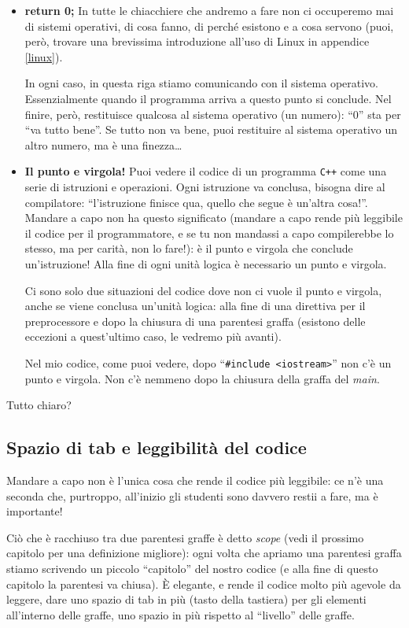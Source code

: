 \begin{itemize}
\item\textbf{return 0;} In tutte le chiacchiere che andremo a fare non ci occuperemo mai di sistemi operativi, di cosa fanno, di perché esistono e a cosa servono (puoi, però, trovare una brevissima introduzione all'uso di Linux in appendice \ref{linux}). 

In ogni caso, in questa riga stiamo comunicando con il sistema operativo. Essenzialmente quando il programma arriva a questo punto si conclude. Nel finire, però, restituisce qualcosa al sistema operativo (un numero): ``0'' sta per ``va tutto bene''. Se tutto non va bene, puoi restituire al sistema operativo un altro numero, ma è una finezza\ldots

\item\textbf{Il punto e virgola!}
Puoi vedere il codice di un programma \verb|C++| come una serie di istruzioni e operazioni. Ogni istruzione va conclusa, bisogna dire al compilatore: ``l'istruzione finisce qua, quello che segue è un'altra cosa!''. Mandare a capo non ha questo significato (mandare a capo rende più leggibile il codice per il programmatore, e se tu non mandassi a capo compilerebbe lo stesso, ma per carità, non lo fare!): è il punto e virgola che conclude un'istruzione! Alla fine di ogni unità logica è necessario un punto e virgola. 

Ci sono solo due situazioni del codice dove non ci vuole il punto e virgola, anche se viene conclusa un'unità logica: alla fine di una direttiva per il preprocessore e dopo la chiusura di una parentesi graffa (esistono delle eccezioni a quest'ultimo caso, le vedremo più avanti).

Nel mio codice, come puoi vedere, dopo ``\verb|#include <iostream>|'' non c'è un punto e virgola. Non c'è nemmeno dopo la chiusura della graffa del \emph{main}.
\end{itemize}
Tutto chiaro?
\subsection{Spazio di tab e leggibilità del codice}
Mandare a capo non è l'unica cosa che rende il codice più leggibile: ce n'è una seconda che, purtroppo, all'inizio gli studenti sono davvero restii a fare, ma è importante!


Ciò che è racchiuso tra due parentesi graffe è detto \emph{scope} (vedi il prossimo capitolo per una definizione migliore): ogni volta che apriamo una parentesi graffa stiamo scrivendo un piccolo ``capitolo'' del nostro codice (e alla fine di questo capitolo la parentesi va chiusa). \`E elegante, e rende il codice molto più agevole da leggere, dare uno spazio di tab in più (tasto della tastiera)  per gli elementi all'interno delle graffe, uno spazio in più rispetto al ``livello'' delle graffe. 

